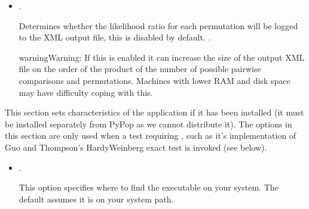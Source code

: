 \documentclass[letterpaper,10pt,english,openany,oneside]{sphinxmanual}
\begin{document}
\sphinxAtStartPar
\sphinxcode{\sphinxupquote{{[}Emhaplofreq{]}}} 
\begin{itemize}
\item {} 
\sphinxAtStartPar
{}.

\sphinxAtStartPar
Determines whether the likelihood ratio for each permutation will be
logged to the XML output file, this is disabled by default.
\sphinxstylestrong{{[}Default:}  \sphinxstylestrong{(i.e. OFF){]}}.

\begin{sphinxadmonition}{warning}{Warning:}
\sphinxAtStartPar
If this is enabled it can  increase the size of the
output XML file on the order of the product of the number of
possible pairwise comparisons and permutations. Machines with
lower RAM and disk space may have difficulty coping with this.
\end{sphinxadmonition}

\end{itemize}

\sphinxAtStartPar
\sphinxcode{\sphinxupquote{{[}Arlequin{]}}} 

\sphinxAtStartPar
This section sets characteristics of the 
application if it has been installed (it must be installed separately
from PyPop as we cannot distribute it). The options in this section
are only used when a test requiring , such as it’s
implementation of Guo and Thompson’s  Hardy\sphinxhyphen{}Weinberg
exact test is invoked (see below).
\begin{itemize}
\item {} 
\sphinxAtStartPar
{}.

\sphinxAtStartPar
This option specifies where to find the 
executable on your system. The default assumes it is on your system
path. \sphinxstylestrong{{[}Default:}  \sphinxstylestrong{{]}}

\end{itemize}

\sphinxAtStartPar
\sphinxcode{\sphinxupquote{{[}HardyWeinbergGuoThompsonArlequin{]}}} 
\end{document}
